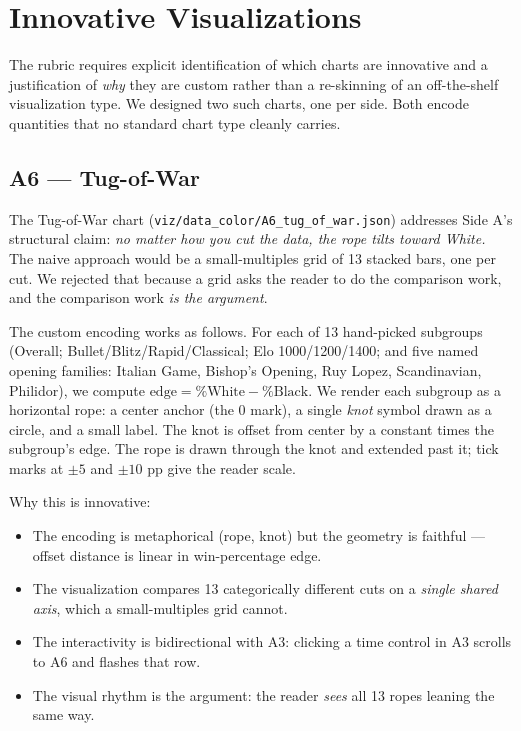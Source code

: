 \documentclass[sigconf,nonacm,natbib=false]{acmart}
\begin{document}
\section{Innovative Visualizations}
\label{sec:innovative}

The rubric requires explicit identification of which charts are
innovative and a justification of \emph{why} they are custom rather
than a re-skinning of an off-the-shelf visualization type. We
designed two such charts, one per side. Both encode quantities that
no standard chart type cleanly carries.

\subsection{A6 --- Tug-of-War}

The Tug-of-War chart (\texttt{viz/data\_color/A6\_tug\_of\_war.json})
addresses Side A's structural claim: \emph{no matter how you cut the
data, the rope tilts toward White.} The naive approach would be a
small-multiples grid of 13 stacked bars, one per cut. We rejected
that because a grid asks the reader to do the comparison work, and
the comparison work \emph{is the argument}.

The custom encoding works as follows. For each of 13 hand-picked
subgroups (Overall; Bullet/Blitz/Rapid/Classical; Elo
1000/1200/1400; and five named opening families: Italian Game,
Bishop's Opening, Ruy Lopez, Scandinavian, Philidor), we compute
$\mathrm{edge} = \%\mathrm{White} - \%\mathrm{Black}$. We render
each subgroup as a horizontal rope: a center anchor (the 0 mark), a
single \emph{knot} symbol drawn as a circle, and a small label. The
knot is offset from center by a constant times the subgroup's edge.
The rope is drawn through the knot and extended past it; tick
marks at $\pm 5$ and $\pm 10$ pp give the reader scale.

Why this is innovative:
\begin{itemize}
\item The encoding is metaphorical (rope, knot) but the geometry is
  faithful --- offset distance is linear in win-percentage edge.
\item The visualization compares 13 categorically different cuts on
  a \emph{single shared axis}, which a small-multiples grid cannot.
\item The interactivity is bidirectional with A3: clicking a time
  control in A3 scrolls to A6 and flashes that row.
\item The visual rhythm is the argument: the reader \emph{sees} all
  13 ropes leaning the same way.
\end{itemize}
\end{document}
